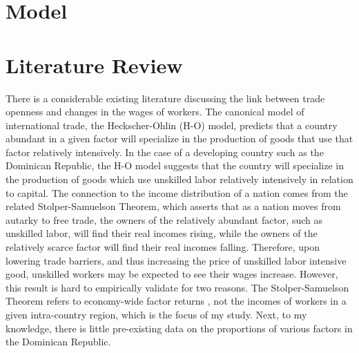 \documentclass[12pt]{article}
\begin{document}

\vspace{-10pt}
\section{Model}
\label{sec:Model}


\vspace{-10pt}
\section{Literature Review}
\label{sec:Litreview}
There is a considerable existing literature discussing the link between trade openness
and changes in the wages of workers.
The canonical model of international trade, the Heckscher-Ohlin (H-O) model, 
predicts that a country abundant in a given factor will specialize 
in the production of goods that use that factor relatively intensively.
In the case of a developing country such as the Dominican Republic, the 
H-O model suggests that the country will specialize in the production of goods
which use unskilled labor relatively intensively in relation to capital. 
The connection to the income
distribution of a nation comes from the related Stolper-Samuelson Theorem,
which asserts that as a nation moves from autarky to free trade, the owners of the relatively
abundant factor, such as unskilled labor, will find their real incomes rising, while the owners of
the relatively scarce factor will find their real incomes falling. 
Therefore, upon lowering trade barriers, and thus increasing the price of unskilled labor intensive
good, unskilled workers may be expected to see their wages
increase.
However, this result is hard to empirically validate for two reasons. The Stolper-Samuelson Theorem
refers to economy-wide factor returns \citep{goldberg}, not the incomes of workers in a given intra-country
region, which is the focus of my study. Next, to my knowledge, there is little pre-existing data on the 
proportions of various factors in the Dominican Republic.
\end{document}
